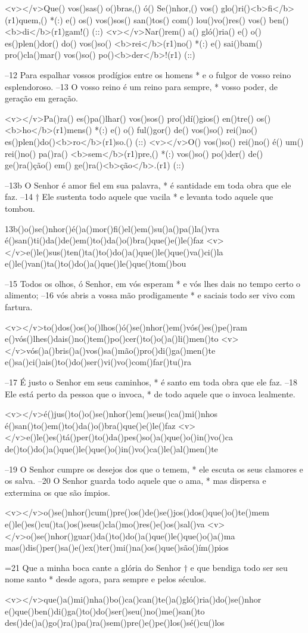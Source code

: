 <v></v>Que() vos()sas() o()bras,() ó() Se()nhor,() vos() glo()ri()<b>fi</b>(r1)quem,() *(:)
e() os() vos()sos() san()tos() com() lou()vo()res() vos() ben()<b>di</b>(r1)gam!() (::)
<v></v>Nar()rem() a() gló()ria() e() o() es()plen()dor() do() vos()so() <b>rei</b>(r1)no() *(:)
e() sai()bam() pro()cla()mar() vos()so() po()<b>der</b>!(r1) (::)

–12 Para espalhar vossos prodígios entre os homens *
e o fulgor de vosso reino esplendoroso.
–13 O vosso reino é um reino para sempre, *
vosso poder, de geração em geração.

<v></v>Pa()ra() es()pa()lhar() vos()sos() pro()dí()gios() en()tre() os() <b>ho</b>(r1)mens() *(:)
e() o() ful()gor() de() vos()so() rei()no() es()plen()do()<b>ro</b>(r1)so.() (::)
<v></v>O() vos()so() rei()no() é() um() rei()no() pa()ra() <b>sem</b>(r1)pre,() *(:)
vos()so() po()der() de() ge()ra()ção() em() ge()ra()<b>ção</b>.(r1) (::)

–13b O Senhor é amor fiel em sua palavra, *
é santidade em toda obra que ele faz.
–14 † Ele sustenta todo aquele que vacila *
e levanta todo aquele que tombou.

13b()o()se()nhor()é()a()mor()fi()el()em()su()a()pa()la()vra
é()san()ti()da()de()em()to()da()o()bra()que()e()le()faz
<v></v>e()le()sus()ten()ta()to()do()a()que()le()que()va()ci()la
e()le()van()ta()to()do()a()que()le()que()tom()bou

–15 Todos os olhos, ó Senhor, em vós esperam *
e vós lhes dais no tempo certo o alimento;
–16 vós abris a vossa mão prodigamente *
e saciais todo ser vivo com fartura.

<v></v>to()dos()os()o()lhos()ó()se()nhor()em()vós()es()pe()ram
e()vós()lhes()dais()no()tem()po()cer()to()o()a()li()men()to
<v></v>vós()a()bris()a()vos()sa()mão()pro()di()ga()men()te
e()sa()ci()ais()to()do()ser()vi()vo()com()far()tu()ra

–17 É justo o Senhor em seus caminhos, *
é santo em toda obra que ele faz.
–18 Ele está perto da pessoa que o invoca, *
de todo aquele que o invoca lealmente.

<v></v>é()jus()to()o()se()nhor()em()seus()ca()mi()nhos
é()san()to()em()to()da()o()bra()que()e()le()faz
<v></v>e()le()es()tá()per()to()da()pes()so()a()que()o()in()vo()ca
de()to()do()a()que()le()que()o()in()vo()ca()le()al()men()te

–19 O Senhor cumpre os desejos dos que o temem, *
ele escuta os seus clamores e os salva.
–20 O Senhor guarda todo aquele que o ama, *
mas dispersa e extermina os que são ímpios.

<v></v>o()se()nhor()cum()pre()os()de()se()jos()dos()que()o()te()mem
e()le()es()cu()ta()os()seus()cla()mo()res()e()os()sal()va
<v></v>o()se()nhor()guar()da()to()do()a()que()le()que()o()a()ma
mas()dis()per()sa()e()ex()ter()mi()na()os()que()são()ím()pios

=21 Que a minha boca cante a glória do Senhor †
e que bendiga todo ser seu nome santo *
desde agora, para sempre e pelos séculos.

<v></v>que()a()mi()nha()bo()ca()can()te()a()gló()ria()do()se()nhor
e()que()ben()di()ga()to()do()ser()seu()no()me()san()to
des()de()a()go()ra()pa()ra()sem()pre()e()pe()los()sé()cu()los